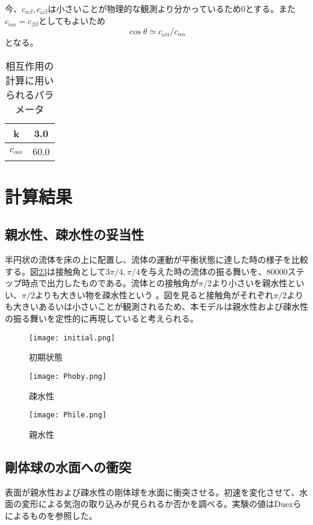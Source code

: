 \documentclass[]{jsarticle}
\begin{document}
今、$c_{\alpha\beta},c_{\omega\beta}$は小さいことが物理的な観測より分かっているため0とする。また$c_{\alpha\alpha}=c_{\beta\beta}$としてもよいため
\begin{equation}
\cos\theta\simeq c_{\omega\alpha}/c_{\alpha\alpha}
\end{equation}
となる。
\begin{table}[h]
  \caption{相互作用の計算に用いられるパラメータ}
  \label{interParam}
  \begin{center}
    \begin{tabular}{|c|c|}\hline
      k&3.0 \\ \hline
      $c_{\alpha\alpha}$ & 60.0 \\ \hline
    \end{tabular}
  \end{center}  
\end{table}

\section{計算結果}
\subsection{親水性、疎水性の妥当性}
\label{subsec:label}


半円状の流体を床の上に配置し、流体の運動が平衡状態に達した時の様子を比較する。図\ref{fig:Phoby}\ref{fig:Phile}は接触角として$3\pi/4, \pi/4$を与えた時の流体の振る舞いを、80000ステップ時点で出力したものである。流体との接触角が$\pi/2$より小さいを親水性といい、$\pi/2$よりも大きい物を疎水性という \cite{Truscott2012}。図を見ると接触角がそれぞれ$\pi/2$よりも大きいあるいは小さいことが観測されるため、本モデルは親水性および疎水性の振る舞いを定性的に再現していると考えられる。
\begin{figure}[H]
  \centering
  \texttt{[image: initial.png]}
  \caption{初期状態}
  \label{fig:initial}
\end{figure}
\begin{figure}[H]
    \centering
    \texttt{[image: Phoby.png]}
    \caption{疎水性}
    \label{fig:Phoby}
  \end{figure}
  \begin{figure}[H]
    \centering
    \texttt{[image: Phile.png]}
    \caption{親水性}
    \label{fig:Phile}
\end{figure}

\subsection{剛体球の水面への衝突}
表面が親水性および疎水性の剛体球を水面に衝突させる。初速を変化させて、水面の変形による気泡の取り込みが見られるか否かを調べる。実験の値はDuez\cite{Duez2007}らによるものを参照した。
\label{subsec:label}





\end{document}
